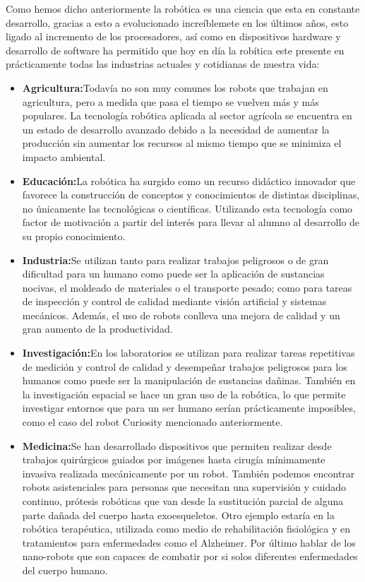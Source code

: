 \hspace{1cm} Como hemos dicho anteriormente la robótica es una ciencia que esta en constante desarrollo, gracias a esto a evolucionado increíblemete en los últimos años, esto ligado al incremento de los procesadores, así como en dispositivos hardware y desarrollo de software ha permitido que hoy en día la robítica este presente en prácticamente todas las industrias actuales y cotidianas de nuestra vida:
\begin{itemize}
		\item \textbf{Agricultura:}Todavía no son muy comunes los robots que trabajan en agricultura, pero a medida que pasa el tiempo se vuelven más y más populares. La tecnología robótica aplicada al sector agrícola se encuentra en un estado de desarrollo avanzado debido a la necesidad de aumentar la producción sin aumentar los recursos al mismo tiempo que se minimiza el impacto ambiental.
		\item \textbf{Educación:}La robótica ha surgido como un recurso didáctico innovador que favorece la construcción de conceptos y conocimientos de distintas disciplinas, no únicamente las tecnológicas o científicas.  Utilizando esta tecnología como factor de motivación a partir del interés para llevar al alumno al desarrollo de su propio conocimiento.
		\item \textbf{Industria:}Se utilizan tanto para realizar trabajos peligrosos o de gran dificultad para un humano como puede ser la aplicación de sustancias nocivas, el moldeado de materiales o el transporte pesado; como para tareas de inspección y control de calidad mediante visión artificial y sistemas mecánicos. Además, el uso de robots conlleva una mejora de calidad y un gran aumento de la productividad.
		\item \textbf{Investigación:}En los laboratorios se utilizan para realizar tareas repetitivas de medición y control de calidad y desempeñar trabajos peligrosos para los humanos como puede ser la manipulación de sustancias dañinas. También en la investigación espacial se hace un gran uso de la robótica, lo que permite investigar entornos que para un ser humano serían prácticamente imposibles, como el caso del robot Curiosity mencionado anteriormente.
		\item \textbf{Medicina:}Se han desarrollado dispositivos que permiten realizar desde trabajos quirúrgicos guiados por imágenes hasta cirugía mínimamente invasiva realizada mecánicamente por un robot. También podemos encontrar robots asistenciales para personas que necesitan una supervisión y cuidado continuo, prótesis robóticas que van desde la sustitución parcial de alguna parte dañada del cuerpo hasta exoesqueletos. Otro ejemplo estaría en la robótica terapéutica, utilizada como medio de rehabilitación fisiológica y en tratamientos para enfermedades como el Alzheimer. Por último hablar de los nano-robots que son capaces de combatir por si solos diferentes enfermedades del cuerpo humano.

\end{itemize}
